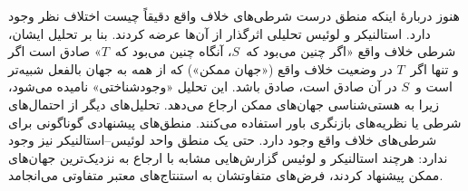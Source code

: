 \documentclass[../../../include/open-logic-section]{subfiles}
\begin{document}
هنوز دربارهٔ اینکه منطق درست شرطی‌های خلاف واقع دقیقاً چیست اختلاف نظر
وجود دارد. استالنیکر و لوئیس تحلیلی اثرگذار از آن‌ها عرضه کردند. بنا بر
تحلیل ایشان، شرطی خلاف واقع «اگر چنین می‌بود که~$S$، آنگاه چنین می‌بود
که~$T$» صادق است اگر و تنها اگر~$T$ در وضعیت خلاف واقع («جهان ممکن»)
که از همه به جهان بالفعل شبیه‌تر است و~$S$ در آن صادق است، صادق باشد.
این تحلیل «وجودشناختی» نامیده می‌شود، زیرا به هستی‌شناسی جهان‌های ممکن
ارجاع می‌دهد. تحلیل‌های دیگر از احتمال‌های شرطی یا نظریه‌های بازنگری
باور استفاده می‌کنند. منطق‌های پیشنهادی گوناگونی برای شرطی‌های خلاف
واقع وجود دارد. حتی یک منطق واحد لوئیس--استالنیکر نیز وجود ندارد:
هرچند استالنیکر و لوئیس گزارش‌هایی مشابه با ارجاع به نزدیک‌ترین
جهان‌های ممکن پیشنهاد کردند، فرض‌های متفاوتشان به استنتاج‌های معتبر
متفاوتی می‌انجامد.
\end{document}
